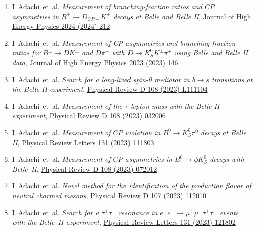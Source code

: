 \documentclass[12pt]{article}
\begin{document}
\begin{justify}
\begin{enumerate}[a.]
\begin{enumerate}[1.]
    \item I~Adachi~et~al. \emph{Measurement of branching-fraction ratios and $CP$ asymmetries in $B^{\pm} \to D_{CP\pm} K^{\pm}$ decays at Belle and Belle II}, \href{https://doi.org/10.1007/JHEP05(2024)212}{Journal of High Energy Physics 2024 (2024) 212}
    \item I~Adachi~et~al. \emph{Measurement of CP asymmetries and branching-fraction ratios for $B^{\pm} \to D K^{\pm}$ and $D\pi^{\pm}$ with $D \to K_S^0 K^{\pm} \pi^{\mp}$ using Belle and Belle II data}, \href{https://doi.org/10.1007/JHEP09(2023)146}{Journal of High Energy Physics 2023 (2023) 146}
    \item I~Adachi~et~al. \emph{Search for a long-lived spin-0 mediator in $b \to s$ transitions at the Belle II experiment}, \href{https://doi.org/10.1103/PhysRevD.108.L111104}{Physical Review D 108 (2023) L111104}
  \item I~Adachi~et~al. \emph{Measurement of the $\tau$ lepton mass with the Belle II experiment}, \href{https://doi.org/10.1103/PhysRevD.108.032006}{Physical Review D 108 (2023) 032006}
  \item I~Adachi~et~al. \emph{Measurement of $CP$ violation in $B^0 \rightarrow K^0_{S} \pi^0$ decays at Belle II}, \href{https://doi.org/10.1103/PhysRevLett.131.111803}{Physical Review Letters 131 (2023) 111803}
  \item I~Adachi~et~al. \emph{Measurement of $CP$ asymmetries in $B^0 \rightarrow \phi K^0_{S}$ decays with Belle~II}, \href{https://doi.org/10.1103/PhysRevD.108.072012}{Physical Review D 108 (2023) 072012}
  \item I~Adachi~et~al. \emph{Novel method for the identification of the production flavor of neutral charmed mesons}, \href{https://doi.org/10.1103/PhysRevD.107.112010}{Physical Review D 107 (2023) 112010}
  \item I~Adachi~et~al. \emph{Search for a $\tau^+\tau^-$ resonance in $e^{+}e^{-}\rightarrow \mu^{+}\mu^{-} \tau^+\tau^-$ events with the Belle~II experiment}, \href{https://doi.org/10.1103/PhysRevLett.131.121802}{Physical Review Letters 131 (2023) 121802}

\end{enumerate}
\end{enumerate}
\end{justify}
\end{document}

